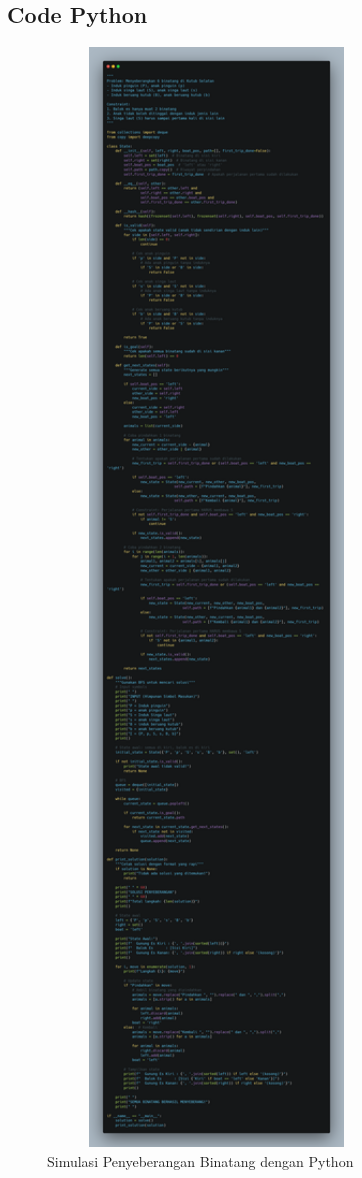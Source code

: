 \documentclass[12pt,a4paper]{article}
\begin{document}
\subsection*{Code Python}
\begin{figure}[H]
    \centering
    \includegraphics[width=0.8\textwidth]{../images/code-python.png}
    \caption{Simulasi Penyeberangan Binatang dengan Python}
    \label{fig:simulation}
\end{figure}
\end{document}
